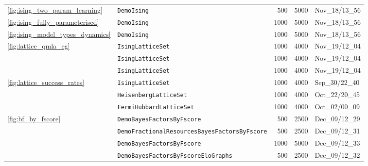 \begin{tabular}{llrrl}
\cref{fig:ising_two_param_learning} & \texttt{DemoIsing} &                                      500 &                                     5000 &                           Nov\_18/13\_56 \\
\cref{fig:ising_fully_parameterised} & \texttt{DemoIsing} &                                     1000 &                                     5000 &                           Nov\_18/13\_56 \\
\cref{fig:ising_model_types_dynamics} & \texttt{DemoIsing} &                                     1000 &                                     5000 &                           Nov\_18/13\_56 \\
\multirow{3}{*}{\cref{fig:lattice_qmla_eg}} & \texttt{IsingLatticeSet} &                                     1000 &                                     4000 &                           Nov\_19/12\_04 \\
                        & \texttt{IsingLatticeSet} &                                     1000 &                                     4000 &                           Nov\_19/12\_04 \\
                        & \texttt{IsingLatticeSet} &                                     1000 &                                     4000 &                           Nov\_19/12\_04 \\
\cline{1-5}
\multirow{3}{*}{\cref{fig:lattice_success_rates}} & \texttt{IsingLatticeSet} &                                     1000 &                                     4000 &                           Sep\_30/22\_40 \\
                        & \texttt{HeisenbergLatticeSet} &                                     1000 &                                     4000 &                           Oct\_22/20\_45 \\
                        & \texttt{FermiHubbardLatticeSet} &                                     1000 &                                     4000 &                           Oct\_02/00\_09 \\
\cline{1-5}
\multirow{4}{*}{\cref{fig:bf_by_fscore}} & \texttt{DemoBayesFactorsByFscore} &                                      500 &                                     2500 &                           Dec\_09/12\_29 \\
                        & \texttt{DemoFractionalResourcesBayesFactorsByFscore} &                                      500 &                                     2500 &                           Dec\_09/12\_31 \\
                        & \texttt{DemoBayesFactorsByFscore} &                                     1000 &                                     5000 &                           Dec\_09/12\_33 \\
                        & \texttt{DemoBayesFactorsByFscoreEloGraphs} &                                      500 &                                     2500 &                           Dec\_09/12\_32 \\
\hline
\end{tabular}
